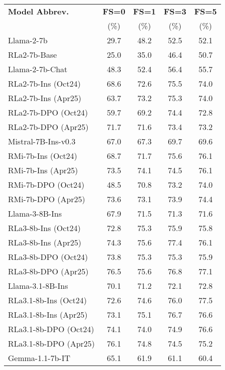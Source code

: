 \begin{table}[ht!]
\centering
\small
\setlength{\tabcolsep}{3pt}
\begin{tabular}{lcccc}
\toprule
\textbf{Model Abbrev.} & \textbf{FS=0} & \textbf{FS=1} & \textbf{FS=3} & \textbf{FS=5} \\
& (\%) & (\%) & (\%) & (\%) \\
\midrule
Llama-2-7b              & 29.7 & 48.2 & 52.5 & 52.1 \\
RLa2-7b-Base            & 25.0 & 35.0 & 46.4 & 50.7 \\
\midrule
Llama-2-7b-Chat         & 48.3 & 52.4 & 56.4 & 55.7 \\
RLa2-7b-Ins (Oct24)     & 68.6 & 72.6 & 75.5 & 74.0 \\
RLa2-7b-Ins (Apr25)     & 63.7 & 73.2 & 75.3 & 74.0 \\
RLa2-7b-DPO (Oct24)     & 59.7 & 69.2 & 74.4 & 72.8 \\
RLa2-7b-DPO (Apr25)     & 71.7 & 71.6 & 73.4 & 73.2 \\
\midrule
Mistral-7B-Ins-v0.3     & 67.0 & 67.3 & 69.7 & 69.6 \\
RMi-7b-Ins (Oct24)      & 68.7 & 71.7 & 75.6 & 76.1 \\
RMi-7b-Ins (Apr25)      & 73.5 & 74.1 & 74.5 & 76.1 \\
RMi-7b-DPO (Oct24)      & 48.5 & 70.8 & 73.2 & 74.0 \\
RMi-7b-DPO (Apr25)      & 73.6 & 73.1 & 73.9 & 74.4 \\
\midrule
Llama-3-8B-Ins          & 67.9 & 71.5 & 71.3 & 71.6 \\
RLa3-8b-Ins (Oct24)     & 72.8 & 75.3 & 75.9 & 75.8 \\
RLa3-8b-Ins (Apr25)     & 74.3 & 75.6 & 77.4 & 76.1 \\
RLa3-8b-DPO (Oct24)     & 73.8 & 75.3 & 75.3 & 75.9 \\
RLa3-8b-DPO (Apr25)     & 76.5 & 75.6 & 76.8 & 77.1 \\
\midrule
Llama-3.1-8B-Ins        & 70.1 & 71.2 & 72.1 & 72.8 \\
RLa3.1-8b-Ins (Oct24)   & 72.6 & 74.6 & 76.0 & 77.5 \\
RLa3.1-8b-Ins (Apr25)   & 73.1 & 75.1 & 76.7 & 76.6 \\
RLa3.1-8b-DPO (Oct24)   & 74.1 & 74.0 & 74.9 & 76.6 \\
RLa3.1-8b-DPO (Apr25)   & 76.1 & 74.8 & 74.5 & 75.2 \\
\midrule
Gemma-1.1-7b-IT         & 65.1 & 61.9 & 61.1 & 60.4 \\

\end{tabular}
\end{table}
